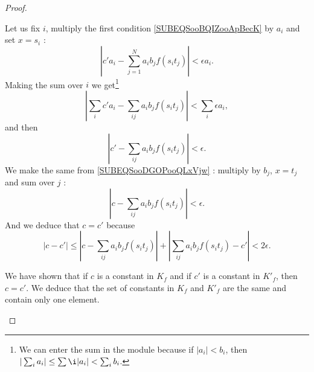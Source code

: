 \begin{proof}
\begin{subproof}
        Let us fix \( i\), multiply the first condition \eqref{SUBEQSooBQIZooApBecK} by \( a_i\) and set \( x=s_i\) :
        \begin{equation}
            | c'a_i-\sum_{j=1}^Na_ib_jf(s_it_j) |<\epsilon a_i.
        \end{equation}
        Making the sum over \( i\) we get\footnote{We can enter the sum in the module because if \( | a_i |<b_i\), then \( | \sum_ia_i |\leq \sum\i| a_i |<\sum_i b_i\).}
        \begin{equation}
            | \sum_ic'a_i-\sum_{ij}a_ib_jf(s_it_j) |<\sum_i\epsilon a_i,
        \end{equation}
        and then
        \begin{equation}
            | c'-\sum_{ij}a_ib_jf(s_it_j) |<\epsilon.
        \end{equation}
        We make the same from \eqref{SUBEQSooDGOPooQLxVjw} : multiply by \( b_j\), \( x=t_j\) and sum over \( j\) :
        \begin{equation}
            | c-\sum_{ij}a_ib_jf(s_it_j) |<\epsilon.
        \end{equation}
        And we deduce that \( c=c'\) because
        \begin{equation}
            | c-c' |\leq | c-\sum_{ij}a_ib_jf(s_it_j) |+| \sum_{ij}a_ib_jf(s_it_j)-c' |<2\epsilon.
        \end{equation}
        
        We have shown that if \( c\) is a constant in \( K_f\) and if \( c'\) is a constant in \( K'_f\), then \( c=c'\). We deduce that the set of constants in \( K_f\) and \( K'_f\) are the same and contain only one element.


\end{subproof}
\end{proof}
